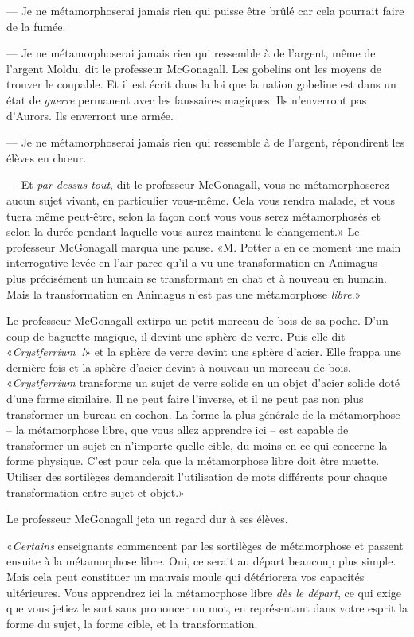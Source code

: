 --- Je ne métamorphoserai jamais rien qui puisse être brûlé car cela pourrait faire de la fumée.

--- Je ne métamorphoserai jamais rien qui ressemble à de l'argent, même de l'argent Moldu, dit le professeur McGonagall. Les gobelins ont les moyens de trouver le coupable. Et il est écrit dans la loi que la nation gobeline est dans un état de \emph{guerre} permanent avec les faussaires magiques. Ils n'enverront pas d'Aurors. Ils enverront une armée.

--- Je ne métamorphoserai jamais rien qui ressemble à de l'argent, répondirent les élèves en chœur.

--- Et \emph{par-dessus tout}, dit le professeur McGonagall, vous ne métamorphoserez aucun sujet vivant, en particulier vous-même. Cela vous rendra malade, et vous tuera même peut-être, selon la façon dont vous vous serez métamorphosés et selon la durée pendant laquelle vous aurez maintenu le changement.» Le professeur McGonagall marqua une pause. «M. Potter a en ce moment une main interrogative levée en l'air parce qu'il a vu une transformation en Animagus -- plus précisément un humain se transformant en chat et à nouveau en humain. Mais la transformation en Animagus n'est pas une métamorphose \emph{libre}.»

Le professeur McGonagall extirpa un petit morceau de bois de sa poche. D'un coup de baguette magique, il devint une sphère de verre. Puis elle dit «\emph{Crystferrium~!}» et la sphère de verre devint une sphère d'acier. Elle frappa une dernière fois et la sphère d'acier devint à nouveau un morceau de bois. «\emph{Crystferrium} transforme un sujet de verre solide en un objet d'acier solide doté d'une forme similaire. Il ne peut faire l'inverse, et il ne peut pas non plus transformer un bureau en cochon. La forme la plus générale de la métamorphose -- la métamorphose libre, que vous allez apprendre ici -- est capable de transformer un sujet en n'importe quelle cible, du moins en ce qui concerne la forme physique. C'est pour cela que la métamorphose libre doit être muette. Utiliser des sortilèges demanderait l'utilisation de mots différents pour chaque transformation entre sujet et objet.»

Le professeur McGonagall jeta un regard dur à ses élèves.

«\emph{Certains} enseignants commencent par les sortilèges de métamorphose et passent ensuite à la métamorphose libre. Oui, ce serait au départ beaucoup plus simple. Mais cela peut constituer un mauvais moule qui détériorera vos capacités ultérieures. Vous apprendrez ici la métamorphose libre \emph{dès le départ}, ce qui exige que vous jetiez le sort sans prononcer un mot, en représentant dans votre esprit la forme du sujet, la forme cible, et la transformation. %


